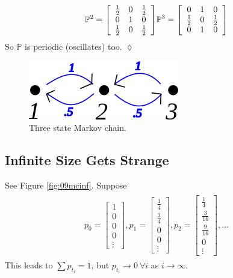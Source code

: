 \begin{example}
\begin{align*}
\begin{split}
\mathbb{P}^2 = \left[\begin{array}{c c c} \frac{1}{2} & 0 & \frac{1}{2} \\ 0 & 1 & 0 \\ \frac{1}{2} & 0 & \frac{1}{2} \end{array}\right]
\end{split}
\begin{split}
\mathbb{P}^3 = \left[\begin{array}{c c c} 0 & 1 & 0 \\ \frac{1}{2} & 0 & \frac{1}{2} \\ 0 & 1 & 0 \end{array}\right]
\end{split}
\end{align*}
So $\mathbb{P}$ is periodic (oscillates) too.
$\lozenge$
\end{example}

\begin{figure}[ht!]
	\centering
	\includegraphics[width=.4\textwidth]{images/09mc3}
	\caption{Three state Markov chain.}
	\label{fig:09mc3}
\end{figure}

\subsection{Infinite Size Gets Strange}
See Figure \ref{fig:09mcinf}. Suppose
\begin{align*}
\begin{split}
p_0 = \left[\begin{array}{c} 1 \\ 0 \\ 0 \\ 0 \\ \vdots \end{array}\right],
p_1 = \left[\begin{array}{c} \frac{1}{4} \\ \frac{3}{4} \\ 0 \\ 0 \\ \vdots \end{array}\right],
p_2 = \left[\begin{array}{c} \frac{1}{4} \\ \frac{3}{16} \\ \frac{9}{16} \\ 0 \\ \vdots \end{array}\right],
\ldots
\end{split}
\end{align*}
This leads to $\sum p_{t_i}=1$, but $p_{t_i}\rightarrow 0 ~\forall i$ as $i\to\infty$.

